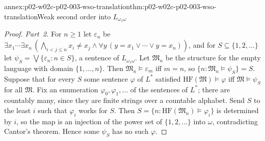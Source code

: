 \begin{annexitem}{annex:p02-w02c-p02-003-wso-translation}{thm:p02-w02c-p02-003-wso-translation}{Weak second order into \(L_{\omega_1\omega}\)}
\begin{proof}
\emph{Part~2.}  For \(n\geq1\) let \(\varepsilon_n\) be
\(\exists x_1\cdots\exists x_n\,(\bigwedge_{i<j\leq n}x_i\neq x_j\land
\forall y\,(y=x_1\lor\cdots\lor y=x_n))\), and for
\(S\subseteq\{1,2,\ldots\}\) let \(\psi_S=\bigvee\{\varepsilon_n:n\in S\}\),
a sentence of \(L_{\omega_1\omega}\).  Let \(\mathfrak M_n\) be the
structure for the empty language with domain \(\{1,\ldots,n\}\).  Then
\(\mathfrak M_n\models\varepsilon_m\) iff \(m=n\), so
\(\{n:\mathfrak M_n\models\psi_S\}=S\).  Suppose that for every \(S\) some
sentence \(\varphi\) of \(L^{*}\) satisfied
\(\mathrm{HF}(\mathfrak M)\models\varphi\) iff \(\mathfrak M\models\psi_S\)
for all \(\mathfrak M\).  Fix an enumeration
\(\varphi_0,\varphi_1,\ldots\) of the sentences of \(L^{*}\); there are
countably many, since they are finite strings over a countable alphabet.
Send \(S\) to the least \(i\) such that \(\varphi_i\) works for \(S\).
Then \(S=\{n:\mathrm{HF}(\mathfrak M_n)\models\varphi_i\}\) is determined by
\(i\), so the map is an injection of the power set of \(\{1,2,\ldots\}\)
into \(\omega\), contradicting Cantor's theorem.  Hence some \(\psi_S\) has
no such \(\varphi\).
\end{proof}
\end{annexitem}

